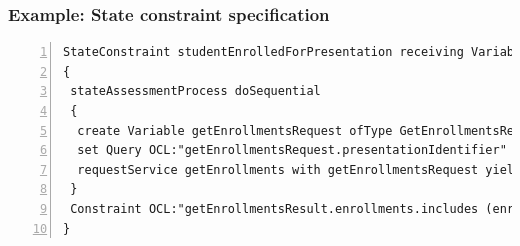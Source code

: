 

\begin{frame}[fragile]
\frametitle{Example: State constraint specification}

\lstset{language=urdad,label=serviceTextSyntax}
\begin{lstlisting}[numbers=left,escapechar=|]
StateConstraint studentEnrolledForPresentation receiving Variable enrollForPresentationRequest ofType EnrollForPresentationRequest
{
 stateAssessmentProcess doSequential
 {
  create Variable getEnrollmentsRequest ofType GetEnrollmentsRequest
  set Query OCL:"getEnrollmentsRequest.presentationIdentifier" equalTo Query OCL:"enrollForPresentationRequest.presentationIdentifier"
  requestService getEnrollments with getEnrollmentsRequest yielding Variable getEnrollmentsResult ofType GetEnrollmentsResult
 }
 Constraint OCL:"getEnrollmentsResult.enrollments.includes (enrollForPresentationRequest.personIdentifier)"
}
\end{lstlisting}
\end{frame}

